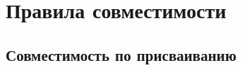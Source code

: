 \hypertarget{compat}{%
\section{Правила совместимости}\label{compat:chapter}}

\hypertarget{compat-assign}{%
\subsection{Совместимость по присваиванию}\label{compat:assign}}


